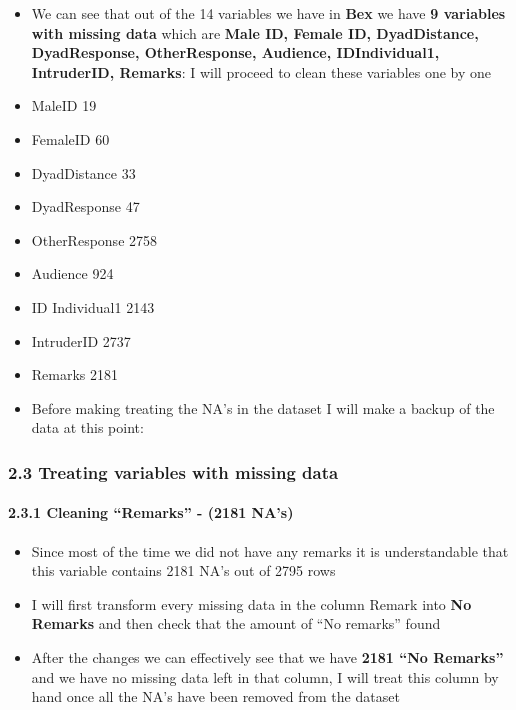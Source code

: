 \documentclass[
]{article}
\begin{document}
\begin{itemize}
\item
  We can see that out of the 14 variables we have in \textbf{Bex} we
  have \textbf{9 variables with missing data} which are \textbf{Male ID,
  Female ID, DyadDistance, DyadResponse, OtherResponse, Audience,
  IDIndividual1, IntruderID, Remarks}: I will proceed to clean these
  variables one by one
\item
  MaleID 19
\item
  FemaleID 60
\item
  DyadDistance 33
\item
  DyadResponse 47
\item
  OtherResponse 2758
\item
  Audience 924
\item
  ID Individual1 2143
\item
  IntruderID 2737
\item
  Remarks 2181
\item
  Before making treating the NA's in the dataset I will make a backup of
  the data at this point:
\end{itemize}

\hypertarget{treating-variables-with-missing-data}{%
\subsubsection{2.3 Treating variables with missing
data}\label{treating-variables-with-missing-data}}

\hypertarget{cleaning-remarks---2181-nas}{%
\paragraph{2.3.1 Cleaning ``Remarks'' - (2181
NA's)}\label{cleaning-remarks---2181-nas}}

\begin{itemize}
\item
  Since most of the time we did not have any remarks it is
  understandable that this variable contains 2181 NA's out of 2795 rows
\item
  I will first transform every missing data in the column Remark into
  \textbf{No Remarks} and then check that the amount of ``No remarks''
  found
\item
  After the changes we can effectively see that we have \textbf{2181
  ``No Remarks''} and we have no missing data left in that column, I
  will treat this column by hand once all the NA's have been removed
  from the dataset
\end{itemize}
\end{document}
